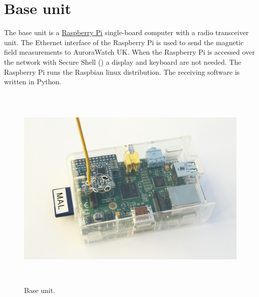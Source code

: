 \clearpage
\section{Base unit}

The base unit is a \href{http://www.raspberrypi.org}{Raspberry Pi}
single-board computer with a radio transceiver unit. The Ethernet
interface of the Raspberry Pi is used to send the magnetic field
measurements to AuroraWatch UK. When the Raspberry Pi is accessed over
the network with Secure Shell (\ssh) a display and keyboard are not
needed. The Raspberry Pi runs the Raspbian linux distribution. The
receiving software is written in Python.

\begin{figure}[!h]
  \centering
  \includegraphics[keepaspectratio,height=10cm]{images/base-unit}
  \caption[Base unit]{%
    Base unit. }
  \label{fig:base-unit}
\end{figure}
